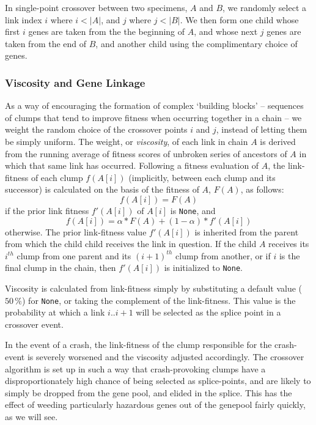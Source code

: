 In single-point crossover between two specimens, $A$ and $B$, we
randomly select a link index $i$ where $i < |A|$, and $j$ where $j
< |B|$. We then form one child whose first $i$ genes are taken
from the the beginning of $A$, and whose next $j$ genes are taken
from the end of $B$, and another child using the complimentary
choice of genes. 

\subsubsection{Viscosity and Gene Linkage}
As a way of encouraging the formation of complex `building
blocks' -- sequences of clumps that tend to improve fitness when
occurring together in a chain -- we weight the random choice of
the crossover points $i$ and $j$, instead of letting them be
simply uniform. The weight, or \emph{viscosity}, of each
link in chain $A$ is derived from the running average of fitness
scores of unbroken series of ancestors of $A$ in which that same link
has occurred. Following a fitness evaluation of $A$, the
link-fitness of each clump $f(A[i])$ (implicitly, between each
clump and its successor) is calculated on the basis of the
fitness of $A$, $F(A)$, as follows: 
  $$ f(A[i]) = F(A)$$
if the prior link fitness $f'(A[i])$ of $A[i]$ is \texttt{None},
and 
  $$ f(A[i]) = \alpha * F(A) + (1-\alpha) * f'(A[i]) $$
otherwise. The prior link-fitness value $f'(A[i])$ is inherited
from the parent from which the child child receives the link in
question. If the child $A$ receives its $i^{th}$ clump from one
parent and its $(i+1)^{th}$ clump from another, or if $i$ is the
final clump in the chain, then $f'(A[i])$ is initialized to
\texttt{None}.

Viscosity is calculated from link-fitness simply by substituting
a default value ($50\,\%$) for \texttt{None}, or taking the
complement of the link-fitness. This value is the probability at
which a link $i..i+1$ will be selected as the splice point in a
crossover event. 

In the event of a crash, the link-fitness of the clump
responsible for the crash-event is severely worsened
and the viscosity adjusted accordingly. The crossover algorithm
is set up in such a way that crash-provoking clumps have a
disproportionately high chance of being selected as
splice-points, and are likely to simply be dropped from the gene
pool, and elided in the splice. This has the effect of weeding
particularly hazardous genes out of the genepool fairly quickly,
as we will see. 

